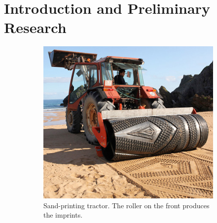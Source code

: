 \chapter{Introduction and Preliminary Research}\label{introduction,research}\label{section \thechapter}

\label{project brief}

\label{art review}
    \begin{figure}%
        \centering
        \begin{subfigure}[b]{0.45\textwidth}
            \includegraphics[width=\textwidth]{Files/sand_machine.jpg}
            \caption{Sand-printing tractor. The roller on the front produces the imprints.}
            \label{fig: sand machine}
        \end{subfigure}
        ~
        \begin{subfigure}[b]{0.45\textwidth}

\end{subfigure}
\end{figure}
